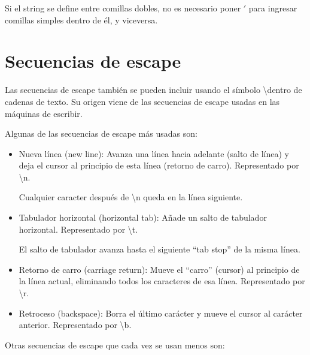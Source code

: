 \documentclass{report}
\newcommand{\doble}[1]{``#1''}
\begin{document}
{Si el string se define entre comillas dobles, no es necesario poner $'$ para ingresar comillas simples dentro de él, y viceversa.


\section{Secuencias de escape}

Las secuencias de escape también se pueden incluir usando el símbolo \textbackslash dentro de cadenas de texto. Su origen viene de las secuencias de escape usadas en las máquinas de escribir.

Algunas de las secuencias de escape más usadas son:

\begin{itemize}
  \item Nueva línea (new line): Avanza una línea hacia adelante (salto de línea) y deja el cursor al principio de esta línea (retorno de carro). Representado por \textbackslash n.
  
  
  Cualquier caracter después de \textbackslash n queda en la línea siguiente.

  \item Tabulador horizontal (horizontal tab): Añade un salto de tabulador horizontal. Representado por \textbackslash t.
  
  
  El salto de tabulador avanza hasta el siguiente \doble{tab stop} de la misma línea.

  \item Retorno de carro (carriage return): Mueve el \doble{carro} (cursor) al principio de la línea actual, eliminando todos los caracteres de esa línea. Representado por \textbackslash r.
  

  \item Retroceso (backspace): Borra el último carácter y mueve el cursor al carácter anterior. Representado por \textbackslash b.
  

\end{itemize}

Otras secuencias de escape que cada vez se usan menos son:

}
\end{document}
